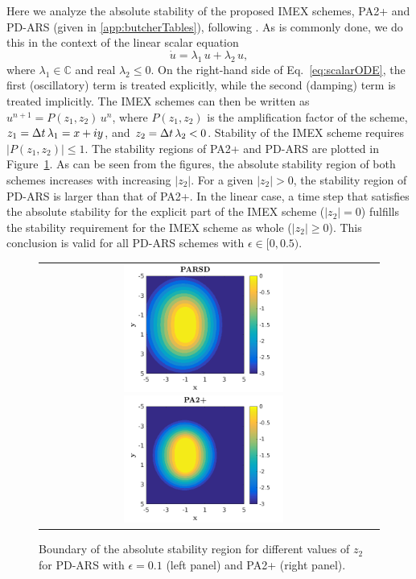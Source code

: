 Here we analyze the absolute stability of the proposed IMEX schemes, PA2+ and PD-ARS (given in \ref{app:butcherTables}), following \cite{hu_etal_2018}.  
As is commonly done, we do this in the context of the linear scalar equation
\begin{equation}
  \dot{u}=\lambda_{1}\,u+\lambda_{2}\,u,
  \label{eq:scalarODE}
\end{equation}
where $\lambda_{1}\in\mathbb{C}$ and real $\lambda_{2}\le0$.  
On the right-hand side of Eq.~\eqref{eq:scalarODE}, the first (oscillatory) term is treated explicitly, while the second (damping) term is treated implicitly.  
The IMEX schemes can then be written as $u^{n+1} =P(z_{1},z_{2})\,u^{n}$, where $P(z_{1},z_{2})$ is the amplification factor of the scheme, $z_{1}=\Delta t\,\lambda_{1} = x +iy$, and $z_{2} = \Delta t\,\lambda_{2} < 0$.  
Stability of the IMEX scheme requires $|P(z_1,z_2)|\leq 1$.  
The stability regions of PA2+ and PD-ARS are plotted in Figure~\ref{fig:AbsoluteStability}.  
As can be seen from the figures, the absolute stability region of both schemes increases with increasing $|z_{2}|$.  
For a given $|z_{2}|>0$, the stability region of PD-ARS is larger than that of PA2+.  
In the linear case, a time step that satisfies the absolute stability for the explicit part of the IMEX scheme ($|z_2| = 0$) fulfills the stability requirement for the IMEX scheme as whole ($|z_2| \geq 0$).  
This conclusion is valid for all PD-ARS schemes with $\epsilon\in [0,0.5)$.
\begin{figure}[h]
  \centering
  \begin{tabular}{cc}
    \includegraphics[width=0.5\textwidth]{figures/AbsoluteStabilityPARSD}
    \includegraphics[width=0.5\textwidth]{figures/AbsoluteStabilityPA2+}
  \end{tabular}
   \caption{Boundary of the absolute stability region for different values of $z_2$ for PD-ARS with $\epsilon = 0.1$ (left panel) and PA2+ (right panel).}
  \label{fig:AbsoluteStability}
\end{figure}